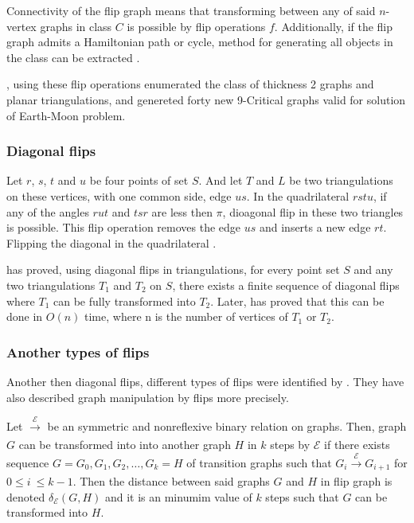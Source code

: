Connectivity of the flip graph means that transforming between any of said $n$-vertex graphs in class $C$ is possible by flip operations $f$. Additionally, if the flip graph admits a Hamiltonian path or cycle, method for generating all objects in the class can be extracted \parencite{savage1997survey}.

\textcite{boutin2008thickness}, using these flip operations enumerated the class of thickness 2 graphs and planar triangulations, and genereted forty new 9-Critical graphs valid for solution of Earth-Moon problem. 

\subsubsection{Diagonal flips}

Let $r$, $s$, $t$ and $u$ be four points of set $S$. And let $T$ and $L$ be two triangulations on these vertices, with one common side, edge $us$. In the quadrilateral $rstu$, if any of the angles $rut$ and $tsr$ are less then $\pi$, dioagonal flip in these two triangles is possible. This flip operation removes the edge $us$ and inserts a new edge $rt$. Flipping the diagonal in the quadrilateral \parencite{LAWSON1972365}.

\textcite{LAWSON1972365} has proved, using diagonal flips in triangulations, for every point set $S$ and any two triangulations $T_1$ and $T_2$ on $S$, there exists a finite sequence of diagonal flips where $T_1$ can be fully transformed into $T_2$. Later, \textcite{komuro1997diagonal} has proved that this can be done in $O(n)$ time, where n is the number of vertices of $T_1$ or $T_2$.


\subsubsection{Another types of flips}

Another then diagonal flips, different types of flips were identified by \textcite{GODDARD1996121}. They have also described graph manipulation by flips more precisely.

Let $\xrightarrow[]{\mathscr{E}}$ be an symmetric and nonreflexive binary relation on graphs. Then, graph $G$ can be transformed into into another graph $H$ in $k$ steps by $\mathscr{E}$ if there exists sequence $G = G_0,G_1,G_2,\dots,G_k = H$ of transition graphs such that $G_i \xrightarrow[]{\mathscr{E}} G_{i+1}$ for $0 \leq i\: \leq k - 1$. Then the distance between said graphs $G$ and $H$ in flip graph is denoted $\delta_\mathscr{E}(G,H)$ and it is an minumim value of $k$ steps such that $G$ can be transformed into $H$.

